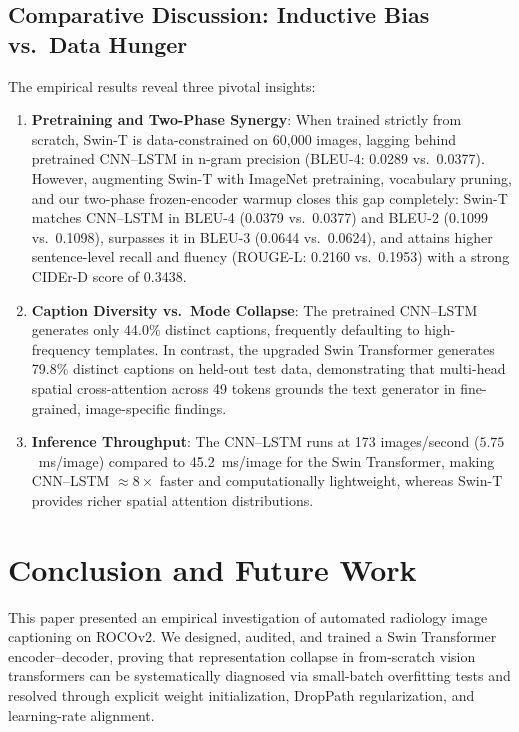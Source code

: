 \documentclass[conference]{IEEEtran}
\begin{document}
\subsection{Comparative Discussion: Inductive Bias vs.\ Data Hunger}
\label{sec:results-discussion}
The empirical results reveal three pivotal insights:
\begin{enumerate}
    \item \textbf{Pretraining and Two-Phase Synergy}: When trained strictly from scratch, Swin-T is data-constrained on 60,000 images, lagging behind pretrained CNN--LSTM in n-gram precision (BLEU-4: 0.0289 vs.\ 0.0377). However, augmenting Swin-T with ImageNet pretraining, vocabulary pruning, and our two-phase frozen-encoder warmup closes this gap completely: Swin-T matches CNN--LSTM in BLEU-4 (0.0379 vs.\ 0.0377) and BLEU-2 (0.1099 vs.\ 0.1098), surpasses it in BLEU-3 (0.0644 vs.\ 0.0624), and attains higher sentence-level recall and fluency (ROUGE-L: 0.2160 vs.\ 0.1953) with a strong CIDEr-D score of 0.3438.
    \item \textbf{Caption Diversity vs.\ Mode Collapse}: The pretrained CNN--LSTM generates only 44.0\% distinct captions, frequently defaulting to high-frequency templates. In contrast, the upgraded Swin Transformer generates 79.8\% distinct captions on held-out test data, demonstrating that multi-head spatial cross-attention across 49 tokens grounds the text generator in fine-grained, image-specific findings.
    \item \textbf{Inference Throughput}: The CNN--LSTM runs at 173 images/second ($5.75$~ms/image) compared to 45.2~ms/image for the Swin Transformer, making CNN--LSTM $\approx 8\times$ faster and computationally lightweight, whereas Swin-T provides richer spatial attention distributions.
\end{enumerate}

\section{Conclusion and Future Work}
\label{sec:conclusion}

This paper presented an empirical investigation of automated radiology image captioning on ROCOv2. We designed, audited, and trained a Swin Transformer encoder--decoder, proving that representation collapse in from-scratch vision transformers can be systematically diagnosed via small-batch overfitting tests and resolved through explicit weight initialization, DropPath regularization, and learning-rate alignment.
\end{document}
